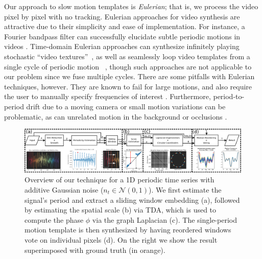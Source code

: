 \documentclass{article}
\begin{document}
Our approach to slow motion templates is {\em Eulerian}; that is, we process the video pixel by pixel with no tracking.  Eulerian approaches for video synthesis are attractive due to their simplicity and ease of implementation.  For instance, a Fourier bandpass filter can successfully elucidate subtle periodic motions in videos \cite{wu2012eulerian, wadhwa2013phase}.  Time-domain Eulerian approaches can synthesize infinitely playing stochastic ``video textures''~\cite{schodl2000video}, as well as seamlessly loop video templates from a single cycle of periodic motion ~\cite{Liao2013VideoLoops,Liao2015VideoLoops}, though such approaches are not applicable to our problem since we fuse multiple cycles.  There are some pitfalls with Eulerian techniques, however.  They are known to fail for large motions, and also require the user to manually specify frequencies of interest \cite{wu2012eulerian, wadhwa2013phase}.  Furthermore, period-to-period drift due to a moving camera or small motion variations can be problematic, as can unrelated motion in the background or occlusions \cite{stauffer1999adaptive}.

\begin{figure}
\centering
\includegraphics[width=\textwidth]{BlockDiagram.pdf}
	\caption{Overview of our technique for a 1D periodic time series with additive Gaussian noise ($n_t \in \mathcal{N}(0, 1)$). We first estimate the signal's period and extract a sliding window embedding (a), followed by estimating the spatial scale (b) via TDA, which is used to compute the phase $\phi$ via the graph Laplacian (c). The single-period motion template is then synthesized by having reordered windows vote on individual pixels (d). On the right we show the result superimposed with ground truth (in orange).}
\label{fig:ConceptFigure}
\end{figure}
\end{document}
